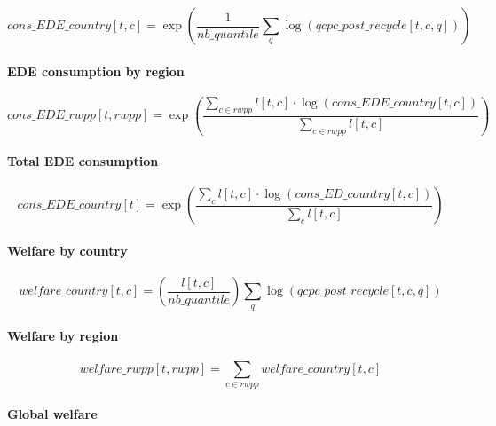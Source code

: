 \documentclass[
]{article}
\begin{document}
\begin{equation}
  cons\_EDE\_country[t,c] = \exp \left( \frac{1}{nb\_quantile} \sum_q \log(qcpc\_post\_recycle[t,c,q]) \right)
\end{equation}

\paragraph{EDE consumption by
region}\label{ede-consumption-by-region-1}

\begin{equation}
  cons\_EDE\_rwpp[t,rwpp] = \exp \left( \frac{\sum_{c \in rwpp} l[t,c] \cdot \log(cons\_EDE\_country[t,c])}{\sum_{c \in rwpp} l[t,c]} \right)
\end{equation}

\paragraph{Total EDE consumption}\label{total-ede-consumption}

\begin{equation}
  cons\_EDE\_country[t] = \exp\left( \frac{\sum_c l[t,c] \cdot \log(cons\_ED\_country[t,c])}{\sum_c l[t,c]} \right)
\end{equation}

\paragraph{Welfare by country}\label{welfare-by-country-1}

\begin{equation}
  welfare\_country[t,c] = \left( \frac{l[t,c]}{nb\_quantile} \right) \sum_q \log(qcpc\_post\_recycle[t,c,q])
\end{equation}

\paragraph{Welfare by region}\label{welfare-by-region-1}

\begin{equation}
  welfare\_rwpp[t,rwpp] = \sum_{c \in rwpp}welfare\_country[t,c]
\end{equation}

\paragraph{Global welfare}\label{global-welfare-1}
\end{document}
